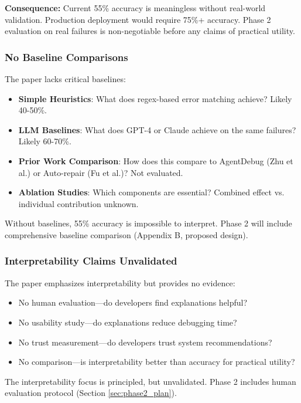 \documentclass[11pt]{article}
\begin{document}
\textbf{Consequence:} Current 55\% accuracy is meaningless without real-world validation. Production deployment would require 75\%+ accuracy. Phase 2 evaluation on real failures is non-negotiable before any claims of practical utility.

\subsubsection{No Baseline Comparisons}

The paper lacks critical baselines:

\begin{itemize}
    \item \textbf{Simple Heuristics}: What does regex-based error matching achieve? Likely 40-50\%.
    \item \textbf{LLM Baselines}: What does GPT-4 or Claude achieve on the same failures? Likely 60-70\%.
    \item \textbf{Prior Work Comparison}: How does this compare to AgentDebug (Zhu et al.) or Auto-repair (Fu et al.)? Not evaluated.
    \item \textbf{Ablation Studies}: Which components are essential? Combined effect vs. individual contribution unknown.
\end{itemize}

Without baselines, 55\% accuracy is impossible to interpret. Phase 2 will include comprehensive baseline comparison (Appendix B, proposed design).

\subsubsection{Interpretability Claims Unvalidated}

The paper emphasizes interpretability but provides no evidence:

\begin{itemize}
    \item No human evaluation—do developers find explanations helpful?
    \item No usability study—do explanations reduce debugging time?
    \item No trust measurement—do developers trust system recommendations?
    \item No comparison—is interpretability better than accuracy for practical utility?
\end{itemize}

The interpretability focus is principled, but unvalidated. Phase 2 includes human evaluation protocol (Section \ref{sec:phase2_plan}).
\end{document}
